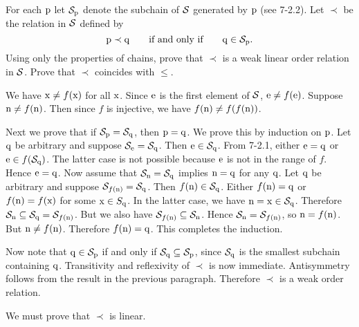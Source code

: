 \begin{exercise}
For each $\mathrm{p}$ let $\mathcal{S}_{\mathrm{p}}$ denote the subchain of $\mathcal{S}$ generated by $\mathrm{p}$ (see 7-2.2).
Let $\prec$ be the relation in $\mathcal{S}$ defined by
\[\mathrm{p}\prec\mathrm{q} \qquad \text{if and only if} \qquad \mathrm{q}\in\mathcal{S}_{\mathrm{p}}.\]
Using only the properties of chains, prove that $\prec$ is a weak linear order relation in $\mathcal{S}$.
Prove that $\prec$ coincides with $\leq$.
\end{exercise}

\begin{solution}
We have $\mathrm{x}\neq f(\mathrm{x})$ for all $\mathrm{x}$. Since $\mathrm{e}$ is the first element of $\mathcal{S}$,
$\mathrm{e}\neq f(\mathrm{e})$. Suppose $\mathrm{n}\neq f(\mathrm{n})$. Then since $f$ is injective, we have
$f(\mathrm{n})\neq f(f(\mathrm{n}))$.

Next we prove that if $\mathcal{S}_{\mathrm{p}}=\mathcal{S}_{\mathrm{q}}$, then $\mathrm{p} = \mathrm{q}$.
We prove this by induction on $\mathrm{p}$.
Let $\mathrm{q}$ be arbitrary and suppose $\mathcal{S}_{\mathrm{e}}=\mathcal{S}_{\mathrm{q}}$. Then $\mathrm{e}\in \mathcal{S}_{\mathrm{q}}$.
From 7-2.1, either $\mathrm{e}=\mathrm{q}$ or $\mathrm{e}\in f(\mathcal{S}_{\mathrm{q}})$.
The latter case is not possible because $\mathrm{e}$ is not in the range of $f$. Hence $\mathrm{e}=\mathrm{q}$.
Now assume that $\mathcal{S}_{\mathrm{n}}=\mathcal{S}_{\mathrm{q}}$ implies $\mathrm{n} = \mathrm{q}$ for any $\mathrm{q}$.
Let $\mathrm{q}$ be arbitrary and suppose $\mathcal{S}_{f(\mathrm{n})}=\mathcal{S}_{\mathrm{q}}$.
Then $f(\mathrm{n})\in \mathcal{S}_{\mathrm{q}}$.  Either $f(\mathrm{n})=\mathrm{q}$ or $f(\mathrm{n})=f(\mathrm{x})$
for some $\mathrm{x}\in S_{\mathrm{q}}$. In the latter case, we have $\mathrm{n}=\mathrm{x}\in\mathcal{S}_{\mathrm{q}}$.
Therefore $\mathcal{S}_{\mathrm{n}}\subseteq \mathcal{S}_{\mathrm{q}}=\mathcal{S}_{f(\mathrm{n})}$.
But we also have $\mathcal{S}_{f(\mathrm{n})}\subseteq\mathcal{S}_{\mathrm{n}}$.
Hence $\mathcal{S}_{\mathrm{n}}=\mathcal{S}_{f(\mathrm{n})}$, so $\mathrm{n}=f(\mathrm{n})$. But $\mathrm{n}\neq f(\mathrm{n})$.
Therefore $f(\mathrm{n})=\mathrm{q}$. This completes the induction.

Now note that $\mathrm{q}\in \mathcal{S}_{\mathrm{p}}$ if and only if $\mathcal{S}_{\mathrm{q}}\subseteq \mathcal{S}_{\mathrm{p}}$, since
$\mathcal{S}_{\mathrm{q}}$ is the smallest subchain containing $\mathrm{q}$.
Transitivity and reflexivity of $\prec$ is now immediate. Antisymmetry follows from the result in the
previous paragraph. Therefore $\prec$ is a weak order relation.

We must prove that $\prec$ is linear.


\end{solution}
